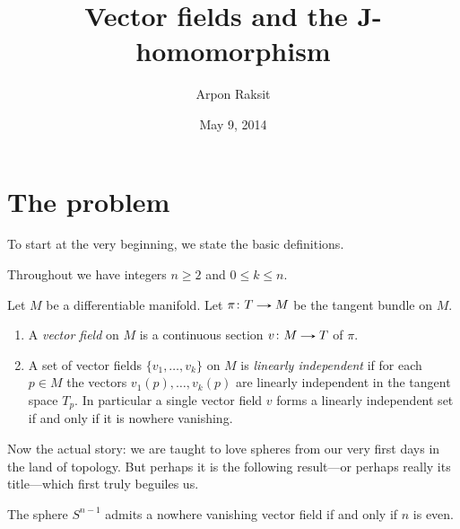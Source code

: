 

\title{Vector fields and the J-homomorphism}
\author{Arpon Raksit}
\date{May 9, 2014}


\maketitle
\thispagestyle{fancy}


\newcommand{\RP}{\mathbb{RP}}
\newcommand{\CP}{\mathbb{CP}}
\newcommand{\Gr}{\operatorname{Gr}}
\newcommand{\Th}{\operatorname{Th}}
\newcommand{\Spin}{\mathrm{Spin}}
\newcommand{\Sq}{\operatorname{Sq}}


\section{The problem}

To start at the very beginning, we state the basic definitions.

\begin{notation}
  \label{ints}
  Throughout we have integers $n \ge 2$ and $0 \le k \le n$.
\end{notation}

\begin{definitions}
  \label{vfield-dfn}
  Let $M$ be a differentiable manifold. Let $\pi \c T \to M$ be the
  tangent bundle on $M$.
  \begin{enumerate}
  \item A \emph{vector field} on $M$ is a continuous section $v \c M
    \to T$ of $\pi$.
  \item A set of vector fields $\{v_1,\ldots,v_k\}$ on $M$ is
    \emph{linearly independent} if for each $p \in M$ the vectors
    $v_1(p),\ldots,v_k(p)$ are linearly independent in the tangent
    space $T_p$. In particular a single vector field $v$ forms a
    linearly independent set if and only if it is nowhere vanishing.
  \end{enumerate}
\end{definitions}

Now the actual story: we are taught to love spheres from our very
first days in the land of topology. But perhaps it is the following
result---or perhaps really its title---which first truly beguiles us.

\begin{theorem}
  \label{hairy-ball}
  The sphere $S^{n-1}$ admits a nowhere vanishing vector field if and
  only if $n$ is even.
\end{theorem}

